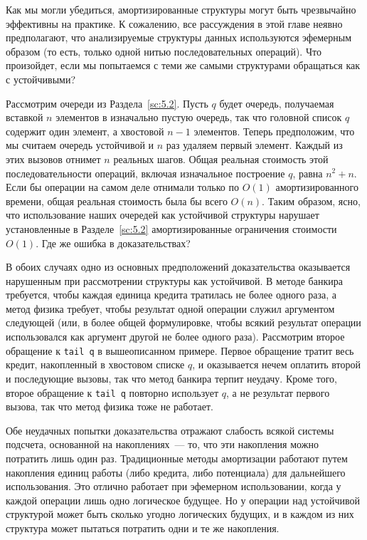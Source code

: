 Как мы могли убедиться, амортизированные структуры могут быть
чрезвычайно эффективны на практике. К сожалению, все рассуждения в
этой главе неявно предполагают, что анализируемые структуры данных
используются эфемерным образом (то есть, только одной нитью
последовательных операций). Что произойдет, если мы попытаемся с теми же
самыми структурами обращаться как с устойчивыми?

Рассмотрим очереди из Раздела~\ref{sc:5.2}. Пусть $q$ будет очередь,
получаемая вставкой $n$ элементов в изначально пустую очередь, так что
головной список $q$ содержит один элемент, а хвостовой $n - 1$
элементов. Теперь предположим, что мы считаем очередь устойчивой и $n$
раз удаляем первый элемент. Каждый из этих вызовов отнимет $n$
реальных шагов.  Общая реальная стоимость этой последовательности
операций, включая изначальное построение $q$, равна $n^2 + n$. Если бы
операции на самом деле отнимали только по $O(1)$ амортизированного
времени, общая реальная стоимость была бы всего $O(n)$. Таким образом,
ясно, что использование наших очередей как устойчивой структуры
нарушает установленные в Разделе~\ref{sc:5.2} амортизированные
ограничения стоимости $O(1)$. Где же ошибка в доказательствах?

В обоих случаях одно из основных предположений доказательства
оказывается нарушенным при рассмотрении структуры как устойчивой. В
методе банкира требуется, чтобы каждая единица кредита тратилась не
более одного раза, а метод физика требует, чтобы результат одной
операции служил аргументом следующей (или, в более общей формулировке,
чтобы всякий результат операции использовался как аргумент другой не
более одного раза).  Рассмотрим второе обращение к \lstinline!tail q!
в вышеописанном примере. Первое обращение тратит весь кредит,
накопленный в хвостовом списке $q$, и оказывается нечем оплатить
второй и последующие вызовы, так что метод банкира терпит
неудачу. Кроме того, второе обращение к \lstinline!tail q! повторно
использует $q$, а не результат первого вызова, так что метод физика
тоже не работает.

Обе неудачных попытки доказательства отражают слабость всякой
системы подсчета, основанной на накоплениях~--- то, что эти накопления
можно потратить лишь один раз. Традиционные методы амортизации
работают путем накопления единиц работы (либо кредита, либо
потенциала) для дальнейшего использования. Это отлично работает при
эфемерном использовании, когда у каждой операции лишь одно логическое
будущее. Но у операции над устойчивой структурой может быть сколько угодно
логических будущих, и в каждом из них структура может пытаться потратить
одни и те же накопления.

